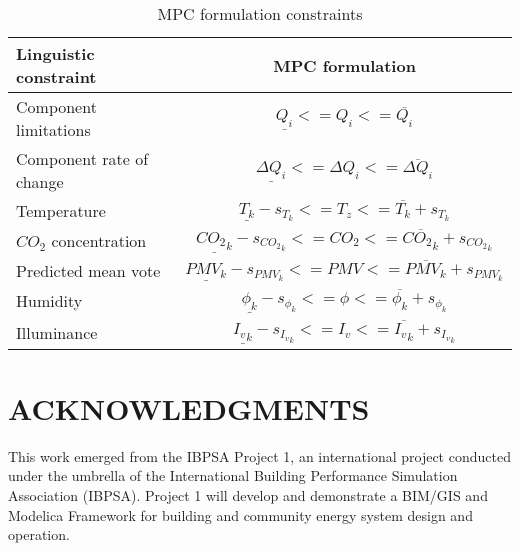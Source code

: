 \documentclass[10pt]{extarticle}
\begin{document}
\renewcommand{\arraystretch}{2.5}
\begin{table}[h]
	\centering
	\caption{MPC formulation constraints}
	\label{tab:mpc_form:constraints}
	\begin{tabular}{l|c}
		\toprule
		\textbf{Linguistic constraint}  & \textbf{MPC formulation} \\
		\midrule
		Component limitations & $ \underline{Q_i}  <= Q_i <= \overline{Q_i} $ \\ 
		Component rate of change & $ \underline{\Delta Q_i}  <= \Delta Q_i <= \overline{\Delta Q_i} $ \\ 
		Temperature &   $ \underline{T_k} - s_{T_k} <= T_z <= \overline{T_k} + s_{T_k} $ \\
		$CO_2$ concentration & $ \underline{{CO_2}_k} - s_{{CO_2}_k} <= CO_2 <= \overline{{CO_2}_k} + s_{{CO_2}_k} $  \\
		Predicted mean vote & $ \underline{PMV_k} - s_{PMV_k} <= PMV <= \overline{PMV_k} + s_{PMV_k} $  \\
		Humidity &  $ \underline{\phi_k} - s_{\phi_k} <= \phi <= \overline{\phi_k} + s_{\phi_k} $  \\
		Illuminance & $ \underline{{I_v}_k} - s_{{I_v}_k} <= I_v <= \overline{{I_v}_k} + s_{{I_v}_k} $  \\
		\bottomrule 
	\end{tabular}
\end{table}




\vspace{24pt}


\section*{ACKNOWLEDGMENTS}

This work emerged from the IBPSA Project 1, an international project conducted under the umbrella of the International Building Performance Simulation Association (IBPSA). Project 1 will develop and demonstrate a BIM/GIS and Modelica Framework for building and community energy system design and operation.
\end{document}
